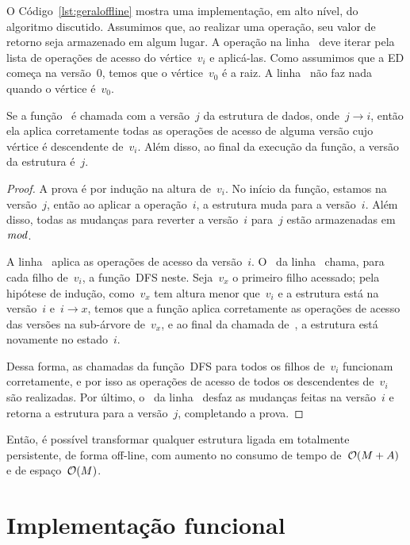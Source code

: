 \documentclass[../../main.tex]{subfiles}
\begin{document}
O Código~\ref{lst:geraloffline} mostra uma implementação, em alto nível, do algoritmo discutido. Assumimos que, ao realizar uma operação, seu valor de retorno seja armazenado em algum lugar. A operação na linha~ deve iterar pela lista de operações de acesso do vértice~$v_i$ e aplicá-las. Como assumimos que a ED começa na versão~0, temos que o vértice~$v_0$ é a raiz. A linha~ não faz nada quando o vértice é~$v_0$.

\begin{proposition}
	Se a função~{\normalfont {}} é chamada com a versão~$j$ da estrutura de dados, onde~${j \rightarrow i}$, então ela aplica corretamente todas as operações de acesso de alguma versão cujo vértice é descendente de~$v_i$. Além disso, ao final da execução da função, a versão da estrutura é~$j$.
\end{proposition}

\begin{proof}
A prova é por indução na altura de~$v_i$. No início da função, estamos na versão~$j$, então ao aplicar a operação~$i$, a estrutura muda para a versão~$i$. Além disso, todas as mudanças para reverter a versão~$i$ para~$j$ estão armazenadas em~$\mathit{mod}$.

A linha~ aplica as operações de acesso da versão~$i$. O~ da linha~ chama, para cada filho de~$v_i$, a função~\textsc{DFS} neste. Seja~$v_x$ o primeiro filho acessado; pela hipótese de indução, como~$v_x$ tem altura menor que~$v_i$ e a estrutura está na versão~$i$ e~${i \rightarrow x}$, temos que a função aplica corretamente as operações de acesso das versões na sub-árvore de~$v_x$, e ao final da chamada de~, a estrutura está novamente no estado~$i$.

Dessa forma, as chamadas da função~\textsc{DFS} para todos os filhos de~$v_i$ funcionam corretamente, e por isso as operações de acesso de todos os descendentes de~$v_i$ são realizadas. Por último, o~ da linha~ desfaz as mudanças feitas na versão~$i$ e retorna a estrutura para a versão~$j$, completando a prova.
\end{proof}

Então, é possível transformar qualquer estrutura ligada em totalmente persistente, de forma off-line, com aumento no consumo de tempo de~$\mathcal{O}(M+A)$ e de espaço~$\mathcal{O}(M)$.

\section{Implementação funcional} \label{sec:implfuncional}
\end{document}
